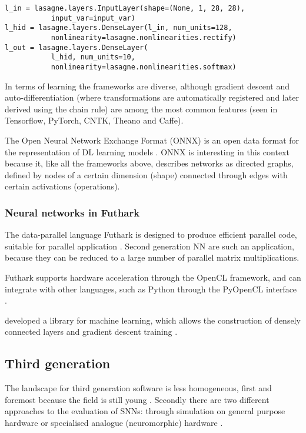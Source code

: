 \documentclass[report.tex]{subfiles}
\begin{document}
\begin{lstlisting}
l_in = lasagne.layers.InputLayer(shape=(None, 1, 28, 28),
           input_var=input_var)
l_hid = lasagne.layers.DenseLayer(l_in, num_units=128,
           nonlinearity=lasagne.nonlinearities.rectify)
l_out = lasagne.layers.DenseLayer(
           l_hid, num_units=10,
           nonlinearity=lasagne.nonlinearities.softmax)
\end{lstlisting} \label{code:lasagne}

In terms of learning the frameworks are diverse, although gradient descent 
and auto-differentiation (where transformations are automatically registered and 
later derived using the chain rule) are among the most common features 
(seen in Tensorflow, PyTorch, CNTK, Theano and Caffe). 

The Open Neural Network Exchange Format (ONNX) is an open data format for the representation
of \gls{DL} learning models \cite{ONNX2018}. 
ONNX is interesting in this context because it, like all the frameworks above, describes 
networks as directed graphs, defined by nodes of a certain dimension (shape) connected through
edges with certain activations (operations).

\subsubsection{Neural networks in Futhark}
The data-parallel language Futhark is designed to produce efficient parallel
code, suitable for parallel application \cite{Henriksen2017}.
Second generation \gls{NN} are such an application, because they can be reduced
to a large number of parallel matrix multiplications.

Futhark supports hardware acceleration through the \gls{OpenCL} framework,
and can integrate with other languages, such as \gls{Python} through the
PyOpenCL interface \cite{PyOpenCL}.

\citeauthor{Minh2018} developed a library for machine learning, which 
allows the construction of densely connected layers and gradient descent
training \cite{Minh2018}.

\subsection{Third generation}
The landscape for third generation software is less homogeneous, first and
foremost because the field is still young \cite{Maass1997}.
Secondly there are two different approaches to the evaluation of \gls{SNN}s:
through simulation on general purpose hardware or specialised analogue
(neuromorphic) hardware \cite{Maass1997, Davison2009, Albada2018}.
\end{document}
